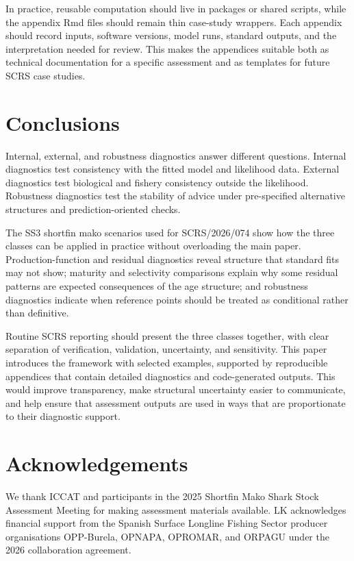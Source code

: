 \documentclass[11pt,a4paper]{article}
\begin{document}
In practice, reusable computation should live in packages or shared scripts, while the appendix Rmd files should remain thin case-study wrappers. Each appendix should record inputs, software versions, model runs, standard outputs, and the interpretation needed for review. This makes the appendices suitable both as technical documentation for a specific assessment and as templates for future SCRS case studies.

\section{Conclusions}

Internal, external, and robustness diagnostics answer different questions. Internal diagnostics test consistency with the fitted model and likelihood data. External diagnostics test biological and fishery consistency outside the likelihood. Robustness diagnostics test the stability of advice under pre-specified alternative structures and prediction-oriented checks.

The SS3 shortfin mako scenarios used for SCRS/2026/074 show how the three classes can be applied in practice without overloading the main paper. Production-function and residual diagnostics reveal structure that standard fits may not show; maturity and selectivity comparisons explain why some residual patterns are expected consequences of the age structure; and robustness diagnostics indicate when reference points should be treated as conditional rather than definitive.

Routine SCRS reporting should present the three classes together, with clear separation of verification, validation, uncertainty, and sensitivity. This paper introduces the framework with selected examples, supported by reproducible appendices that contain detailed diagnostics and code-generated outputs. This would improve transparency, make structural uncertainty easier to communicate, and help ensure that assessment outputs are used in ways that are proportionate to their diagnostic support.

\appendix




\section*{Acknowledgements}

We thank ICCAT and participants in the 2025 Shortfin Mako Shark Stock Assessment Meeting for making assessment materials available. LK acknowledges financial support from the Spanish Surface Longline Fishing Sector producer organisations OPP-Burela, OPNAPA, OPROMAR, and ORPAGU under the 2026 collaboration agreement.



\end{document}
